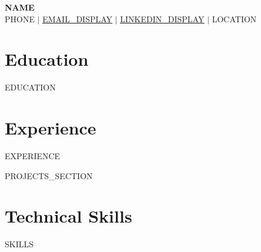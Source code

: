 \documentclass[letterpaper,11pt]{article}
\newcommand{\resumeSubHeadingListStart}{\begin{itemize}[leftmargin=0.15in, label={}]}
\newcommand{\resumeSubHeadingListEnd}{\end{itemize}}
\begin{document}
\begin{center}
    \textbf{\Huge \scshape {{NAME}}} \\ \vspace{1pt}
    \small {{PHONE}} $|$ \href{mailto:{{EMAIL_URL}}}{\underline{{{EMAIL_DISPLAY}}}} $|$
    \href{{{LINKEDIN_URL}}}{\underline{{{LINKEDIN_DISPLAY}}}} $|$
    {{LOCATION}}
\end{center}


\section{Education}
  \resumeSubHeadingListStart
{{EDUCATION}}
  \resumeSubHeadingListEnd

\section{Experience}
 \resumeSubHeadingListStart
{{EXPERIENCE}}
 \resumeSubHeadingListEnd

{{PROJECTS_SECTION}}

\section{Technical Skills}
 \begin{itemize}[leftmargin=0.15in, label={}]
    \small{\item{
{{SKILLS}}
    }}
 \end{itemize}


\end{document}
